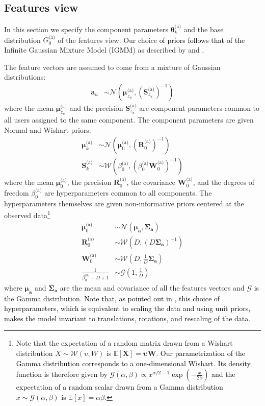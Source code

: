 \documentclass[smallextended]{svjour3}          %
\newcommand\alberto[1]{\textcolor{black}{#1}}
\newcommand{\Muo}{\boldsymbol{\mu}_{0}^\text{(a)}}
\newcommand{\Ro}{\mathbf{R}_{0}^\text{(a)}}
\newcommand{\invRo}{\left(\mathbf{R}_{0}^\text{(a)}\right)^{-1}}
\newcommand{\Wo}{\mathbf{W}_{0}^\text{(a)}}
\newcommand{\betaoa}{\beta_{0}^\text{(a)}}
\newcommand{\Muk}{\boldsymbol{\mu}_{k}^\text{(a)}}
\newcommand{\Sk}{\mathbf{S}_{k}^\text{(a)}}
\newcommand{\Szu}{\mathbf{S}_{z_u}^\text{(a)}}
\newcommand{\invSzu}{\left(\mathbf{S}_{z_u}^{\text{(a)}}\right)^{-1}}
\newcommand{\Muzu}{\boldsymbol{\mu}_{z_u}^\text{(a)}}
\begin{document}
\subsection{Features view}\label{sec:forums_features}
In this section we specify the component parameters $\boldsymbol{\theta}_k^{\text{(a)}}$ and the base distribution $G_0^{\text{(a)}}$ of the features view. Our choice \alberto{of priors follows that of the} Infinite Gaussian Mixture Model (IGMM) as described by  \cite{Rasmussen2000a} and  \cite{Gorur2010}.

The feature vectors are assumed to come from a mixture of Gaussian distributions: 
\begin{align}
\boldsymbol{a}_u &\sim \mathcal{N}\left(\Muzu, \invSzu\right)
\end{align}
where the mean $\Muzu$ and the precision $\Szu$ are component parameters common to all users assigned to the same component. The component parameters are given Normal and Wishart priors: 
\begin{align}
\Muk &\sim  \mathcal{N}\left(\Muo, \invRo\right)\\
\Sk &\sim  \mathcal{W}\left( \betaoa, \left( \betaoa \Wo \right)^{-1}\right) 
\label{eq:wishart_sar}
\end{align}
where the mean $\Muo$, the precision $\Ro$, the covariance $\Wo$, and the degrees of freedom $\betaoa$ are hyperparameters common to all components. The hyperparameters themselves are given non-informative priors centered at the observed data{\footnote{Note that the expectation of a random matrix drawn from a Wishart distribution $X \sim \mathcal{W}(\upsilon, W)$ is $\mathbb{E}[\mathbf{X}] = \mathbf{\upsilon W}$. \alberto{Our parametrization of the Gamma distribution corresponds to a one-dimensional Wishart. Its density function is therefore given by $\mathcal{G}(\alpha, \beta) \propto
x^{\alpha/2-1} \exp(-\frac{x}{2\beta})$
and the expectation of a random scalar drawn from a Gamma distribution $x \sim \mathcal{G}(\alpha, \beta)$ is $\mathbb{E}[x] = \alpha\beta$.}}}
\begin{align}
\Muo &\sim \mathcal{N}(\boldsymbol{\mu_a, \Sigma_a}) \\
\Ro &\sim \mathcal{W}(D, (D \boldsymbol{\Sigma_a})^{-1})\\
\Wo &\sim \mathcal{W}(D, \frac{1}{D} \boldsymbol{\Sigma_a})\\
\frac{1}{\betaoa - D + 1} &\sim \mathcal{G}(1, \frac{1}{D}) \label{eq:gamma_ba0}
\end{align}
where $\boldsymbol{\mu_a}$ and $\boldsymbol{\Sigma_a}$ are the mean and covariance of all the features vectors and $\mathcal{G}$ is the Gamma distribution. \alberto{Note that, as pointed out in \cite{Gorur2010}, this choice of hyperparameters, which is equivalent to scaling the data and using unit priors, makes the model invariant to translations, rotations, and rescaling of the data.} 
\end{document}
